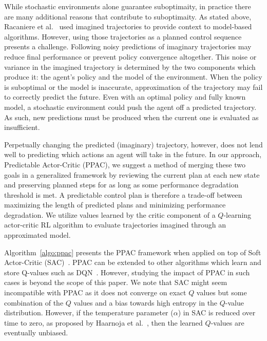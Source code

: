 \documentclass{article}
\begin{document}
        While stochastic environments alone guarantee suboptimaity, in practice there are many additional reasons that contribute to suboptimaity. As stated above, Racaniere et al.~\citeyear{racaniere2017imagination} used imagined trajectories to provide context to model-based algorithms. However, using those trajectories as a planned control sequence presents a challenge. Following noisy predictions of imaginary trajectories may reduce final performance or prevent policy convergence altogether. This noise or variance in the imagined trajectory is determined by the two components which produce it: the agent's policy and the model of the environment. When the policy is suboptimal or the model is inaccurate, approximation of the trajectory may fail to correctly predict the future. Even with an optimal policy and fully known model, a stochastic environment could push the agent off a predicted trajectory. As such, new predictions must be produced when the current one is evaluated as insufficient.

        Perpetually changing the predicted (imaginary) trajectory, however, does not lend well to predicting which actions an agent will take in the future.
        In our approach, Predictable Actor-Critic (PPAC), we suggest a method of merging these two goals in a generalized framework by reviewing the current plan at each new state and preserving planned steps for as long as some performance degradation threshold is met.
        A predictable control plan is therefore a trade-off between maximizing the length of predicted plans and minimizing performance degradation. We utilize values learned by the critic component of a $Q$-learning actor-critic RL algorithm to evaluate trajectories imagined through an approximated model.

        Algorithm~\ref{algo:ppac} presents the PPAC framework when applied on top of Soft Actor-Critic (SAC)~\cite{haarnoja2018soft}. PPAC can be extended to other algorithms which learn and store Q-values such as DQN~\cite{mnih2015human}. However, studying the impact of PPAC in such cases is beyond the scope of this paper. We note that SAC might seem incompatible with PPAC as it does not converge on exact $Q$ values but some combination of the $Q$ values and a bias towards high entropy in the $Q$-value distribution. However, if the temperature parameter ($\alpha$) in SAC is reduced over time to zero, as proposed by Haarnoja et al.~\citeyear{haarnoja2018soft}, then the learned $Q$-values are eventually unbiased.  
        
\end{document}
